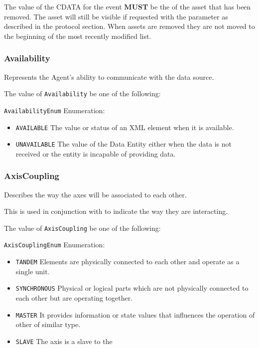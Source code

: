 The value of the \gls{CDATA} for the event \textbf{MUST} be the  of the asset that has been removed. The asset will still be visible if requested with the  parameter as described in the protocol section. When assets are removed they are not moved to the beginning of the most recently modified list.


\subsubsection{Availability}
\label{sec:Availability}



Represents the \gls{Agent}'s ability to communicate with the data source.


The value of \texttt{Availability} \MUST be one of the following: 


\texttt{AvailabilityEnum} Enumeration:

\begin{itemize}
\item \texttt{AVAILABLE} \newline The value or status of an XML element when it is available. 
\item \texttt{UNAVAILABLE} \newline The value of the \gls{Data Entity} either when the data is not received or the entity is incapable of providing data. 
\end{itemize}

\FloatBarrier

\subsubsection{AxisCoupling}
\label{sec:AxisCoupling}



Describes the way the axes will be associated to each other. 
  
 This is used in conjunction with  to indicate the way they are interacting.


The value of \texttt{AxisCoupling} \MUST be one of the following: 


\texttt{AxisCouplingEnum} Enumeration:

\begin{itemize}
\item \texttt{TANDEM} \newline Elements are physically connected to each other and operate as a single unit. 
\item \texttt{SYNCHRONOUS} \newline Physical or logical parts which are not physically connected to each other but are operating together. 
\item \texttt{MASTER} \newline It provides information or state values that influences the operation of other  of similar type. 
\item \texttt{SLAVE} \newline The axis is a slave to the  
\end{itemize}

